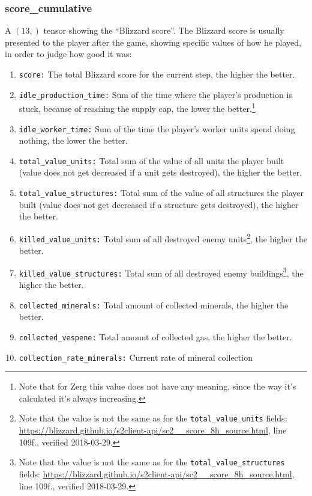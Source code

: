 \documentclass{article}
\begin{document}
\subsubsection{score\_cumulative}
A $(13,)$ tensor showing the ``Blizzard score''. The Blizzard score is usually 
presented to the player after the game, showing specific values of how he 
played, in order to judge how good it was:
\begin{enumerate}[noitemsep,start=0]
\item \texttt{score:} The total Blizzard score for the current step, the higher 
the better.
\item \texttt{idle\_production\_time:} Sum of the time where the player's 
production is stuck, because of reaching the supply cap, the lower the 
better.\footnote{Note that for Zerg this value does not have any meaning, since 
the way it's calculated it's always increasing.}
\item \texttt{idle\_worker\_time:} Sum of the time the player's worker units 
spend doing nothing, the lower the better.
\item \texttt{total\_value\_units:} Total sum of the value of all units the 
player built (value does not get decreased if a unit gets destroyed), the 
higher the better.
\item \texttt{total\_value\_structures:} Total sum of the value of all 
structures the player built (value does not get decreased if a structure gets 
destroyed), the higher the better.
\item \texttt{killed\_value\_units:} Total sum of all destroyed enemy 
units\footnote{Note that the value is not the same as for the 
\texttt{total\_value\_units} fields: 
\url{https://blizzard.github.io/s2client-api/sc2\_\_score\_8h\_source.html}, 
line 109f., verified 2018-03-29.}, the higher the better.
\item \texttt{killed\_value\_structures:} Total sum of all destroyed enemy 
buildings\footnote{Note that the value is not the same as for the 
\texttt{total\_value\_structures} fields: 
\url{https://blizzard.github.io/s2client-api/sc2\_\_score\_8h\_source.html}, 
line 109f., verified 2018-03-29.}, the higher the better.
\item \texttt{collected\_minerals:} Total amount of collected minerals, the 
higher the better.
\item \texttt{collected\_vespene:} Total amount of collected gas, the higher 
the better.
\item \texttt{collection\_rate\_minerals:} Current rate of mineral collection 

\end{enumerate}
\end{document}
